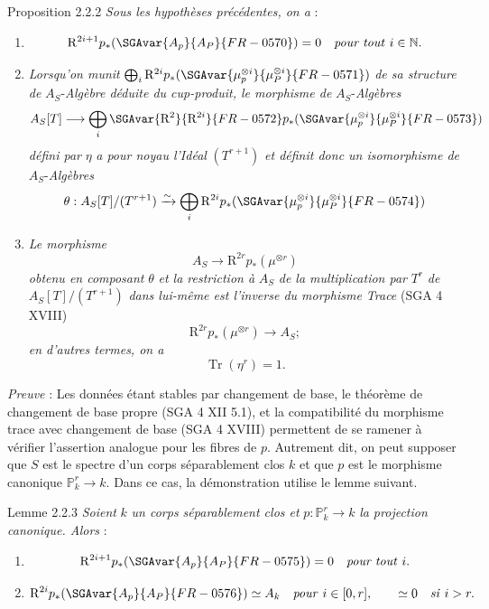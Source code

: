 \begin{statement}{Proposition 2.2.2}
\emph{Sous les hypothèses précédentes, on a} :
\begin{enumerate}[label=\alph*)]
\item
\[
\mathrm{R}^{2i+1}p_*(\SGAvar{A_p}{A_P}{FR-0570})=0\quad\text{\emph{pour tout} }i\in\mathbb{N}.
\]
\item \emph{Lorsqu'on munit} $\bigoplus_i \mathrm{R}^{2i}p_*(\SGAvar{\mu_p^{\otimes i}}{\mu_P^{\otimes i}}{FR-0571})$ \emph{de sa structure de} $A_S$-\emph{Algèbre déduite du cup-produit, le morphisme de} $A_S$-\emph{Algèbres}
\[
A_S[T]\longrightarrow \bigoplus_i \SGAvar{\mathrm{R}^{2}}{\mathrm{R}^{2i}}{FR-0572}p_*(\SGAvar{\mu_p^{\otimes i}}{\mu_P^{\otimes i}}{FR-0573})
\]
\emph{défini par} $\eta$ \emph{a pour noyau l'Idéal} $(T^{r+1})$ \emph{et définit donc un isomorphisme de} $A_S$-\emph{Algèbres}
\[
\theta:A_S[T]/(T^{r+1})\xrightarrow{\sim}\bigoplus_i \mathrm{R}^{2i}p_*(\SGAvar{\mu_p^{\otimes i}}{\mu_P^{\otimes i}}{FR-0574})
\]
\item \emph{Le morphisme}
\[
A_S\longrightarrow \mathrm{R}^{2r}p_*(\mu^{\otimes r})
\]
\emph{obtenu en composant} $\theta$ \emph{et la restriction à} $A_S$ \emph{de la multiplication par} $T^r$ \emph{de} $A_S[T]/(T^{r+1})$ \emph{dans lui-même est l'inverse du morphisme Trace} (SGA 4 XVIII)
\[
\mathrm{R}^{2r}p_*(\mu^{\otimes r})\longrightarrow A_S;
\]
\emph{en d'autres termes, on a}
\[
\operatorname{Tr}(\eta^r)=1.
\]
\end{enumerate}
\end{statement}

\emph{Preuve} : Les données étant stables par changement de base, le théorème de changement de base propre (SGA 4 XII 5.1), et la compatibilité du morphisme trace avec changement de base (SGA 4 XVIII) permettent de se ramener à vérifier l'assertion analogue pour les fibres de $p$. Autrement dit, on peut supposer que $S$ est le spectre d'un corps séparablement clos $k$ et que $p$ est le morphisme canonique $\mathbb{P}^r_k\to k$. Dans ce cas, la démonstration utilise le lemme suivant.

\begin{statement}{Lemme 2.2.3}
\emph{Soient} $k$ \emph{un corps séparablement clos et} $p:\mathbb{P}_k^r\to k$ \emph{la projection canonique. Alors} :
\begin{enumerate}[label=\alph*)]
\item
\[
\mathrm{R}^{2i+1}p_*(\SGAvar{A_p}{A_P}{FR-0575})=0\quad\text{\emph{pour tout} }i.
\]
\item
\[
\mathrm{R}^{2i}p_*(\SGAvar{A_p}{A_P}{FR-0576})\simeq A_k\quad\text{\emph{pour} }i\in[0,r],
\qquad
\simeq 0\quad\text{\emph{si} }i>r.
\]
\end{enumerate}
\end{statement}

